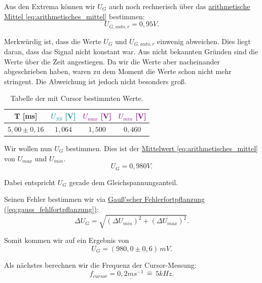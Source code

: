 Aus den Extrema können wir $U_G$ auch noch rechnerisch über das \hyperref[eq:arithmetisches_mittel]{arithmetische Mittel \ref*{eq:arithmetisches_mittel}} bestimmen:
\begin{equation}
    U_{G,auto,r} = 0,95 V.
\end{equation}

Merkwürdig ist, dass die Werte $U_G$ und $U_{G,auto,r}$ einwenig abweichen. Dies liegt daran, dass das Signal nicht konstant war. Aus nicht bekannten Gründen sind die Werte über die Zeit angestiegen. Da wir die Werte aber nacheinander abgeschrieben haben, waren zu dem Moment die Werte schon nicht mehr stringent. Die Abweichung ist jedoch nicht besonders groß.

\begin{table}[h!]
    \centering
    \begin{tabular}{c | c | c | c }
        \toprule
        T [ms] & \textcolor{teal}{$U_{SS}$ [V]} & \textcolor{purple}{$U_{max}$ [V]} & \textcolor{purple}{$U_{min}$ [V]} \\
        \hline
        $5,00 \pm 0,16 $ & $1,064$ & $1,500$ & $0,460$ \\
        \bottomrule
    \end{tabular}
    \caption{Tabelle der mit Cursor bestimmten Werte. }
    \label{tab:sig1_cursor}
\end{table}

Wir wollen nun $U_{G}$ bestimmen. Dies ist der \hyperref[eq:arithmetisches_mittel]{Mittelwert \ref*{eq:arithmetisches_mittel}} von $U_{max}$ und $U_{min}$. 
\begin{equation}
    U_{G} = 0,980 V.
\end{equation}

Dabei entspricht $U_{G}$ gerade dem Gleichspannungsanteil.

Seinen Fehler bestimmen wir via \hyperref[eq:gauss_fehlfortpflanzung]{Gauß'scher Fehlerfortpflanzung (\ref*{eq:gauss_fehlfortpflanzung})}:
\begin{equation}
    \Delta U_{G} = \sqrt{\left(\Delta U_{min}\right)^2 + \left(\Delta U_{max}\right)^2}.
\end{equation}

Somit kommen wir auf ein Ergebnis von 
\begin{equation}
    \boxed{
        U_{G} = (980,0 \pm 0,6) \, mV
    }.
\end{equation}

Als nächstes berechnen wir die Frequenz der Cursor-Messung:
\begin{equation}
    \underline{
        f_{cursor} = 0,2 ms^{-1} \, \hat= \, 5kHz
    }.
\end{equation}

